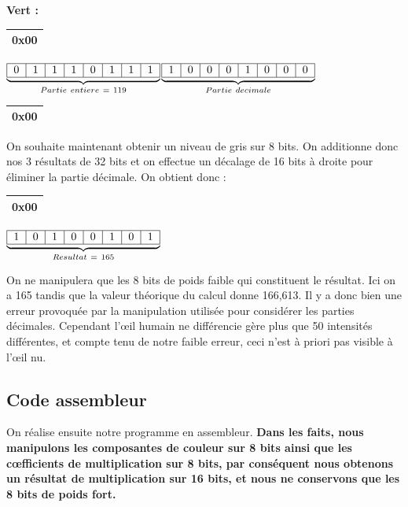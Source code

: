 \noindent \textbf{Vert :}
\begin{center}
\begin{tabular}{|c||}
    \hline
    \textbf{0x00}\\
    \hline
    \end{tabular}$\underbrace{
    \begin{tabular}{|c|c|c|c|c|c|c|c|}
    \hline
    0 & 1 & 1 & 1 & 0 & 1 & 1 & 1 \\
    \hline
    \end{tabular}}_{Partie\ entiere\ =\ 119}$$\underbrace{
    \begin{tabular}{|c|c|c|c|c|c|c|c|}
    \hline
    1 & 0 & 0 & 0 & 1 & 0 & 0 & 0 \\
    \hline
    \end{tabular}}_{Partie\ decimale}$\begin{tabular}{||c|}
    \hline
    \textbf{0x00} \\
    \hline
    \end{tabular} 
\end{center}

On souhaite maintenant obtenir un niveau de gris sur 8 bits. On additionne donc nos 3 résultats de 32 bits et on effectue un décalage de 16 bits à droite pour éliminer la partie décimale. On obtient donc :
\begin{center}
\begin{tabular}{|c||}
    \hline
    \textbf{0x00}\\
    \hline
    \end{tabular}$\underbrace{
    \begin{tabular}{|c|c|c|c|c|c|c|c|}
    \hline
    1 & 0 & 1 & 0 & 0 & 1 & 0 & 1 \\
    \hline
    \end{tabular}}_{Resultat\ =\ 165}$ 
\end{center}
On ne manipulera que les 8 bits de poids faible qui constituent le résultat. Ici on a 165 tandis que la valeur théorique du calcul donne 166,613. Il y a donc bien une erreur provoquée par la manipulation utilisée pour considérer les parties décimales. Cependant l'\oe{}il humain ne différencie gère plus que 50 intensités différentes, et compte tenu de notre faible erreur, ceci n'est à priori pas visible à l'\oe{}il nu.

\subsection{Code assembleur}
On réalise ensuite notre programme en assembleur. \textbf{Dans les faits, nous manipulons les composantes de couleur sur 8 bits ainsi que les c\oe{}fficients de multiplication sur 8 bits, par conséquent nous obtenons un résultat de multiplication sur 16 bits, et nous ne conservons que les 8 bits de poids fort.}

